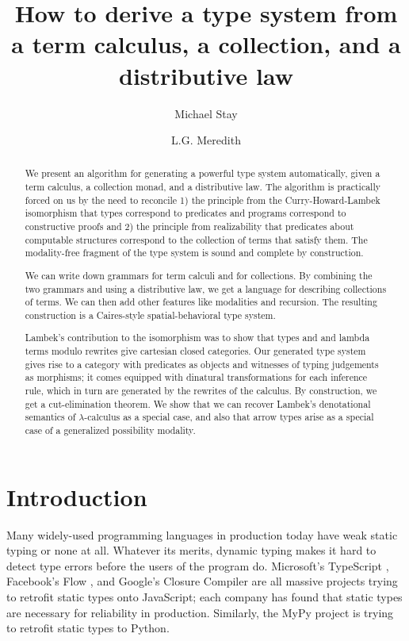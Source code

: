 \documentclass[submission,copyright,creativecommons]{eptcs}
\newcommand{\lac}{$\lambda\mbox{-calculus}$\xspace}
\begin{document}
\EnableBpAbbreviations
\title{How to derive a type system from a term calculus, a collection, and a distributive law}
\author{Michael Stay
  \and
  L.G. Meredith
}
\maketitle
\begin{abstract}
  \noindent We present an algorithm for generating a powerful type system automatically, given a term calculus, a collection monad, and a distributive law.  The algorithm is practically forced on us by the need to reconcile 1) the principle from the Curry-Howard-Lambek isomorphism that types correspond to predicates and programs correspond to constructive proofs and 2) the principle from realizability that predicates about computable structures correspond to the collection of terms that satisfy them.  The modality-free fragment of the type system is sound and complete by construction.  
  
  We can write down grammars for term calculi and for collections.  By combining the two grammars and using a distributive law, we get a language for describing collections of terms.  We can then add other features like modalities and recursion.  The resulting construction is a Caires-style spatial-behavioral type system.
  
  Lambek's contribution to the isomorphism was to show that types and and lambda terms modulo rewrites give cartesian closed categories.  Our generated type system gives rise to a category with predicates as objects and witnesses of typing judgements as morphisms; it comes equipped with dinatural transformations for each inference rule, which in turn are generated by the rewrites of the calculus.  By construction, we get a cut-elimination theorem.  We show that we can recover Lambek's denotational semantics of \lac as a special case, and also that arrow types arise as a special case of a generalized possibility modality.
\end{abstract}

\EnableBpAbbreviations

\section{Introduction}

Many widely-used programming languages in production today have weak static typing or none at all.  Whatever its merits, dynamic typing makes it hard to detect type errors before the users of the program do.  Microsoft's TypeScript \cite{TypeScript},
Facebook's Flow \cite{Flow}, 
and Google's Closure Compiler \cite{Closure}
are all massive projects trying to retrofit static types onto JavaScript; each company has found that static types are necessary for reliability in production.  Similarly, the MyPy project \cite{MyPy}
is trying to retrofit static types to Python.
\end{document}
